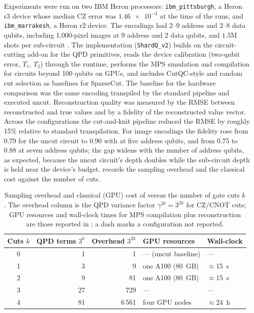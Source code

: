 Experiments were run on two IBM Heron processors: \texttt{ibm\_pittsburgh}, a Heron r3 device whose median CZ error was $\num{1.46e-3}$ at the time of the runs, and \texttt{ibm\_marrakesh}, a Heron r2 device. The encodings had 2--9 address and 2--8 data qubits, including 1,000-pixel images at 9 address and 2 data qubits, and $1.5$M shots per sub-circuit \cite{guo2025shardq}. The implementation (\texttt{ShardQ\_v2}) builds on the \qiskit{} circuit-cutting add-on for the QPD primitives, reads the device calibration (two-qubit error, $T_1$, $T_2$) through the \qiskit{} runtime, performs the MPS simulation and compilation for circuits beyond 100 qubits on GPUs, and includes CutQC-style and random cut selection as baselines for SparseCut. The baseline for the hardware comparison was the same encoding transpiled by the standard \qiskit{} pipeline and executed uncut. Reconstruction quality was measured by the RMSE between reconstructed and true values and by a fidelity of the reconstructed value vector. Across the configurations the cut-and-knit pipeline reduced the RMSE by roughly 15\% relative to standard transpilation. For image encodings the fidelity rose from 0.79 for the uncut \qcrank{} circuit to 0.90 with \shardq{} at five address qubits, and from 0.75 to 0.88 at seven address qubits; the gap widens with the number of address qubits, as expected, because the uncut circuit's depth doubles while the sub-circuit depth is held near the device's budget.  records the sampling overhead and the classical cost against the number of cuts.

\begin{table}[htbp]
\caption{Sampling overhead and classical (GPU) cost of \shardq{} versus the number of gate cuts $k$. The overhead column is the QPD variance factor $\gamma^{2k} = 3^{2k}$ for CZ/CNOT cuts; GPU resources and wall-clock times for MPS compilation plus reconstruction are those reported in \cite{guo2025shardq}; a dash marks a configuration not reported.}\label{tab:qml:shardq-overhead}
\centering
\small
\begin{tabular}{@{}crrll@{}}
\toprule
Cuts $k$ & QPD terms $3^{k}$ & Overhead $3^{2k}$ & GPU resources & Wall-clock \\
\midrule
0 & 1 & 1 & --- (uncut baseline) & --- \\
1 & 3 & 9 & one A100 (\SI{80}{GB}) & $\approx$\SI{15}{\second} \\
2 & 9 & 81 & one A100 (\SI{80}{GB}) & $\approx$\SI{15}{\second} \\
3 & 27 & 729 & --- & --- \\
4 & 81 & 6\,561 & four GPU nodes & $\approx$\SI{24}{\hour} \\
\bottomrule
\end{tabular}
\end{table}

